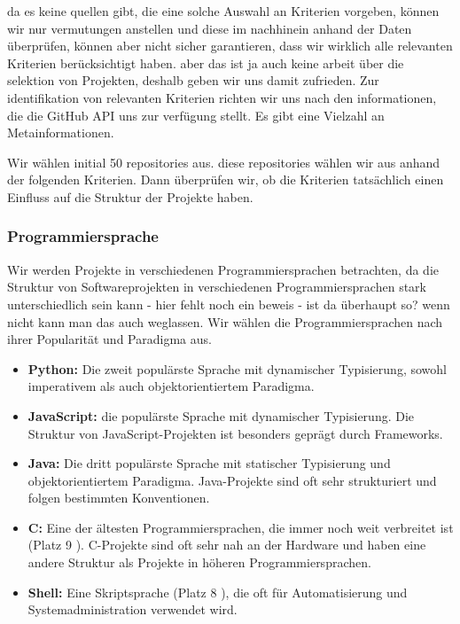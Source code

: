 da es keine quellen gibt, die eine solche Auswahl an Kriterien vorgeben, können wir nur vermutungen anstellen und diese im nachhinein anhand der Daten überprüfen, können aber nicht sicher garantieren, dass wir wirklich alle relevanten Kriterien berücksichtigt haben. aber das ist ja auch keine arbeit über die selektion von Projekten, deshalb geben wir uns damit zufrieden.
Zur identifikation von relevanten Kriterien richten wir uns nach den informationen, die die GitHub API uns zur verfügung stellt. Es gibt eine Vielzahl an Metainformationen. 

Wir wählen initial 50 repositories aus. diese repositories wählen wir aus anhand der folgenden Kriterien. Dann überprüfen wir, ob die Kriterien tatsächlich einen Einfluss auf die Struktur der Projekte haben.

\subsubsection*{Programmiersprache} Wir werden Projekte in verschiedenen Programmiersprachen betrachten, da die Struktur von Softwareprojekten in verschiedenen Programmiersprachen stark unterschiedlich sein kann - hier fehlt noch ein beweis - ist da überhaupt so? wenn nicht kann man das auch weglassen. Wir wählen die Programmiersprachen nach ihrer Popularität und Paradigma aus. 
    \begin{itemize}
        \item \textbf{Python:} Die zweit populärste Sprache \cite{software_state_2022} mit dynamischer Typisierung, sowohl imperativem als auch objektorientiertem Paradigma. 
        \item \textbf{JavaScript:} die populärste Sprache \cite{software_state_2022} mit dynamischer Typisierung. Die Struktur von JavaScript-Projekten ist besonders geprägt durch Frameworks.
        \item \textbf{Java:} Die dritt populärste Sprache \cite{software_state_2022} mit statischer Typisierung und objektorientiertem Paradigma. Java-Projekte sind oft sehr strukturiert und folgen bestimmten Konventionen.
        \item \textbf{C:} Eine der ältesten Programmiersprachen, die immer noch weit verbreitet ist (Platz 9 \cite{software_state_2022}). C-Projekte sind oft sehr nah an der Hardware und haben eine andere Struktur als Projekte in höheren Programmiersprachen.
        \item \textbf{Shell:} Eine Skriptsprache (Platz 8 \cite{software_state_2022}), die oft für Automatisierung und Systemadministration verwendet wird.
    \end{itemize}

